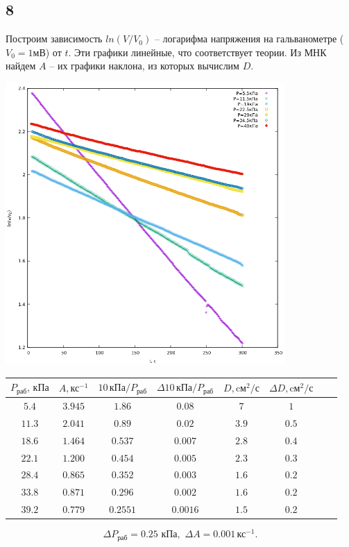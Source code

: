 \subsection*{8}
Построим зависимость $ln(V/V_0)$ -- логарифма напряжения на гальванометре ($V_0 = 1\text{мВ}$) от $t$. Эти графики линейные, что соответствует теории. Из МНК найдем $A$ -- их графики наклона, из которых вычислим $D$.
\begin{center}
	\includegraphics[width=0.80\textwidth]{plot_0.png}
\end{center}

\begin{center}
\begin{tabular}{|c|c|c|c|c|c|c|c|}\hline
$P_\text{раб},\,\text{кПа}$&$A, \text{кс}^{-1}$&$10\,\text{кПа}/P_\text{раб}$&$\Delta 10\,\text{кПа}/P_\text{раб}$
&$D, \text{cм}^2/\text{с}$&$\Delta D, \text{cм}^2/\text{с}$
\\ \hline
$5.4$&$3.945$&$1.86$&$0.08$&$7$&$1$\\ \hline
$11.3$&$2.041$&$0.89$&$0.02$&$3.9$&$0.5$\\ \hline
$18.6$&$1.464$&$0.537$&$0.007$&$2.8$&$0.4$\\ \hline
$22.1$&$1.200$&$0.454$&$0.005$&$2.3$&$0.3$\\ \hline
$28.4$&$0.865$&$0.352$&$0.003$&$1.6$&$0.2$\\ \hline
$33.8$&$0.871$&$0.296$&$0.002$&$1.6$&$0.2$\\ \hline
$39.2$&$0.779$&$0.2551$&$0.0016$&$1.5$&$0.2$\\ \hline
\end{tabular}
\end{center}
$$\Delta P_\text{раб}=0.25\,\,\text{кПа},\,\,\Delta A=0.001\, \text{кс}^{-1}.$$

